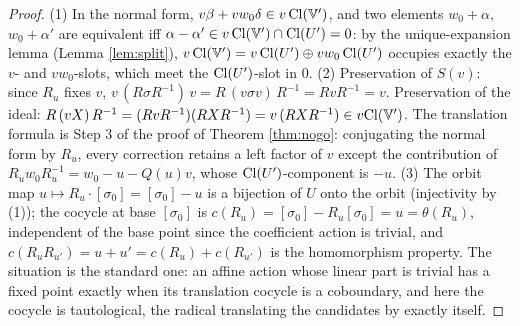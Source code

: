 \begin{proof}
(1) In the normal form, $v\beta + vw_0\delta \in v\,\mathrm{Cl}(\mathbb{V}')$, and two elements $w_0 + \alpha$, $w_0 + \alpha'$ are equivalent iff $\alpha - \alpha' \in v\,\mathrm{Cl}(\mathbb{V}') \cap \mathrm{Cl}(U') = 0$: by the unique-expansion lemma (Lemma \ref{lem:split}), $v\,\mathrm{Cl}(\mathbb{V}') = v\,\mathrm{Cl}(U') \oplus vw_0\,\mathrm{Cl}(U')$ occupies exactly the $v$- and $vw_0$-slots, which meet the $\mathrm{Cl}(U')$-slot in $0$. (2) Preservation of $S(v)$: since $R_u$ fixes $v$, $v\,(R\sigma R^{-1})\,v = R\,(v\sigma v)\,R^{-1} = RvR^{-1} = v$. Preservation of the ideal: $R\,(vX)\,R^{-1} = (RvR^{-1})(RXR^{-1}) = v\,(RXR^{-1}) \in v\mathrm{Cl}(\mathbb{V}')$. The translation formula is Step 3 of the proof of Theorem \ref{thm:nogo}: conjugating the normal form by $R_u$, every correction retains a left factor of $v$ except the contribution of $R_u w_0 R_u^{-1} = w_0 - u - Q(u)v$, whose $\mathrm{Cl}(U')$-component is $-u$. (3) The orbit map $u \mapsto R_u \cdot [\sigma_0] = [\sigma_0] - u$ is a bijection of $U$ onto the orbit (injectivity by (1)); the cocycle at base $[\sigma_0]$ is $c(R_u) = [\sigma_0] - R_u[\sigma_0] = u = \theta(R_u)$, independent of the base point since the coefficient action is trivial, and $c(R_uR_{u'}) = u + u' = c(R_u) + c(R_{u'})$ is the homomorphism property. The situation is the standard one: an affine action whose linear part is trivial has a fixed point exactly when its translation cocycle is a coboundary, and here the cocycle is tautological, the radical translating the candidates by exactly itself.
\end{proof}

